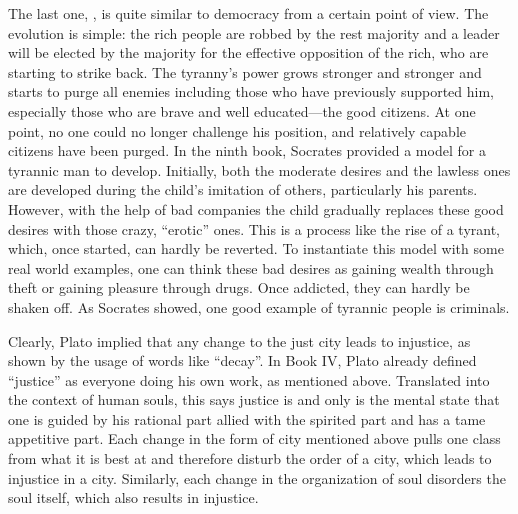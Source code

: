 The last one, , is quite similar to democracy from a certain
point of view. The evolution is simple: the rich people are robbed by the rest
majority and a leader will be elected by the majority for the
effective opposition of the rich, who are starting to strike back. The
tyranny’s power grows stronger and stronger and starts to purge all enemies
including those who have previously supported him, especially those who are
brave and well educated—the good citizens. At one point, no one
could no longer challenge his position, and relatively capable citizens have
been purged. In the ninth book, Socrates provided a model for a tyrannic man to
develop. Initially, both the moderate desires and the lawless ones are developed
during the child’s imitation of others, particularly his parents.
However, with the help of bad companies the child gradually replaces these good
desires with those crazy, “erotic” ones. This is a process like the rise of a
tyrant, which, once started, can hardly be reverted. To
instantiate this model with some real world examples, one can think these bad
desires as gaining wealth through theft or gaining pleasure through drugs. Once
addicted, they can hardly be shaken off. As Socrates showed, one good
example of tyrannic people is criminals.

Clearly, Plato implied that any change to the just city leads to injustice, as
shown by the usage of words like “decay”. In Book IV, Plato already
defined “justice” as everyone doing his own work, as mentioned above.
Translated into the context of human souls, this says justice is and only is the
mental state that one is guided by his rational part allied with the spirited
part and has a tame appetitive part. Each change in the form of city mentioned
above pulls one class from what it is best at and therefore disturb the order of
a city, which leads to injustice in a city. Similarly, each change in the
organization of soul disorders the soul itself, which also results in injustice.
